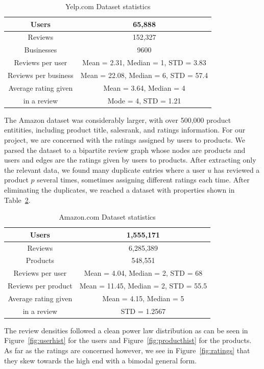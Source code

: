 \documentclass[letterpaper, 10 pt, conference]{ieeeconf}
\begin{document}
\begin{table}[htb]
\centering
\begin{tabular}{|c|c|}
\hline
Users &65,888 \tabularnewline \hline
Reviews &152,327 \tabularnewline \hline
Businesses &9600 \tabularnewline \hline
Reviews per user &Mean = 2.31, Median = 1, STD = 3.83 
\tabularnewline \hline
Reviews per business &Mean = 22.08, Median = 6, STD = 57.4 
\tabularnewline \hline
Average rating given &Mean = 3.64, Median = 4 \tabularnewline
in a review &Mode = 4, STD = 1.21 
\tabularnewline \hline

\end{tabular}
\caption{ Yelp.com Dataset statistics }
\label{table:yelpstats}
\end{table}

The Amazon dataset was considerably larger, with over 
500,000 product entitities, including product title, salesrank, and ratings 
information. For our project, we are concerned with the ratings assigned 
by users to products. We parsed the dataset to a bipartite review 
graph whose nodes are products and users and edges are the ratings given by 
users to products. After extracting only the relevant data, we found many 
duplicate entries where a user $u$ has reviewed a product $p$ several times, 
sometimes assigning different ratings each time. After eliminating the 
duplicates, we reached a dataset with properties shown in 
Table~\ref{table:amazonstats}.

\begin{table}[htb]
\centering
\begin{tabular}{|c|c|}
\hline
Users &1,555,171 \tabularnewline \hline
Reviews &6,285,389 \tabularnewline \hline
Products &548,551 \tabularnewline \hline
Reviews per user &Mean = 4.04, Median = 2, STD = 68
\tabularnewline \hline
Reviews per product &Mean = 11.45, Median = 2, STD = 55.5 
\tabularnewline \hline
Average rating given &Mean = 4.15, Median = 5 \tabularnewline
in a review &STD = 1.2567
\tabularnewline \hline

\end{tabular}
\caption{ Amazon.com Dataset statistics }
\label{table:amazonstats}
\end{table}

The review densities followed a clean power law distribution as can be seen
in Figure~\ref{fig:userhist} for the users and Figure~\ref{fig:producthist}
for the products. As far as the ratings are concerned however, we see in
Figure~\ref{fig:ratings} that they skew towards the high end with a bimodal
general form.
\end{document}
